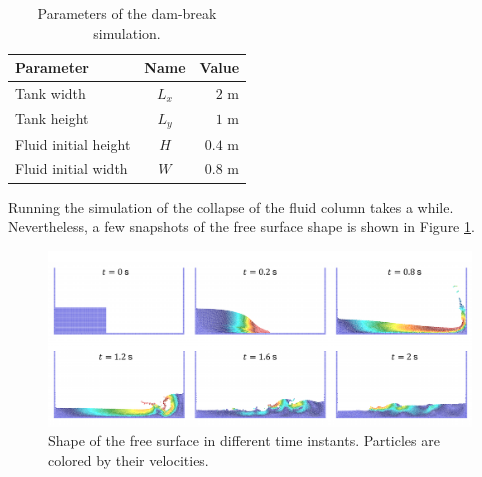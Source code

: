\documentclass[a4paper,12pt,openany]{book}
\theoremstyle{break}
\begin{document}
\begin{table} [H]
\begin{center}
\caption{Parameters of the dam-break simulation.}\label{tbl:dam_break_params}
\begin{tabular}{ l c r }
\toprule[1.5pt]
\bf Parameter & \bf Name & \bf Value \\
\midrule
Tank width & $L_x$ & $2$ m \\
Tank height & $L_y$ & $1$ m \\
Fluid initial height & $H$ & $0.4$ m \\
Fluid initial width & $W$ & $0.8$ m \\
\bottomrule[1.25pt]
\end{tabular}
\end{center}
\end{table}
Running the simulation of the collapse of the fluid column takes a while. Nevertheless, a few snapshots of the free surface shape is shown in Figure \ref{fig:dam_break_results}. 
\begin{figure}[H]
  \includegraphics[scale=0.5]{dam_break_result.pdf}
  \centering
  \caption{Shape of the free surface in different time instants. Particles are colored by their velocities. }
  \label{fig:dam_break_results}
\end{figure}\vspace*{3pt}
\end{document}
